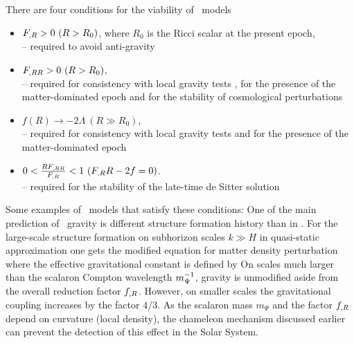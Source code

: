 There are four conditions for the viability of \fR\ models \parencite{Amendola_2007}
\begin{itemize}
	\item $F_{,R}>0\ (R>R_0)$, where $R_0$ is the Ricci scalar at the present epoch,\\
	-- required to avoid anti-gravity \parencite{2010deto.book.....A}\\
	\item $F_{,RR}>0\ (R>R_0)$,\\
	-- required for consistency with local gravity tests \parencite{2005gr.qc.....5136O}, for the presence of the matter-dominated epoch \parencite{2007PhRvL..98m1302A} and for the stability of cosmological perturbations \parencite{2007PhRvD..75d4004S}\\
	\item $f(R)\rightarrow -2\Lambda\ (R\gg R_0)$,\\
	-- required for consistency with local gravity tests \parencite{2008PhRvD..77b3507T} and for the presence of the matter-dominated epoch \parencite{Amendola_2007}\\
	\item $0<\frac{RF_{,RR}}{F_{,R}}<1\ (F_{,R} R-2f=0)$.\\
	-- required for the stability of the late-time de Sitter solution \parencite{1988PhLB..202..198M}
\end{itemize}
Some examples of \fR\ models that satisfy these conditions:
One of the main prediction of \fR\ gravity is different structure formation history than in \LCDM. For the large-scale structure formation on subhorizon scales \mbox{$k\gg H$} in quasi-static approximation one gets the modified equation for matter density perturbation \parencite{2011RSPTA.369.4947B}
where the effective gravitational constant is defined by
On scales much larger than the scalaron Compton wavelength $m_\Psi^{-1}$, gravity is unmodified aside from the overall reduction factor $f_{,R}$. However, on smaller scales the gravitational coupling increases by the factor $4/3$. As the scalaron mass $m_\Psi$ and the factor $f_{,R}$ depend on curvature (local density), the chameleon mechanism discussed earlier can prevent the detection of this effect in the Solar System.

